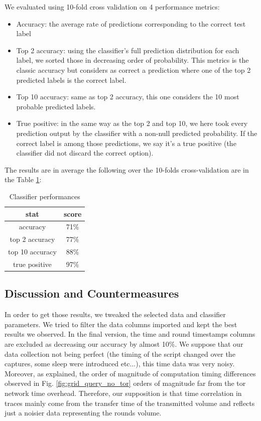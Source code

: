 \documentclass[10pt,conference,compsocconf]{IEEEtran}
\begin{document}
We evaluated using 10-fold cross validation on 4 performance metrics:
\begin{itemize}
    \item Accuracy: the average rate of predictions corresponding to the correct test label
    \item Top 2 accuracy: using the classifier's full prediction distribution for each label, we sorted those in decreasing order of probability. This metrics is the classic accuracy but considers as correct a prediction where one of the top 2 predicted labels is the correct label.
    \item Top 10 accuracy: same as top 2 accuracy, this one considers the 10 most probable predicted labels.
    \item True positive: in the same way as the top 2 and top 10, we here took every prediction output by the classifier with a non-null predicted probability. If the correct label is among those predictions, we say it's a true positive (the classifier did not discard the correct option).
\end{itemize}
The results are in average the following over the 10-folds cross-validation are in the Table \ref{tab:class_perf}:
\begin{table}[h!]
\centering
\begin{tabular}{ |c|c| } 
\hline
stat & score \\
\hline
\hline
accuracy & 71\% \\ 
top 2 accuracy & 77\% \\ 
top 10 accuracy & 88\% \\
true positive & 97\% \\ 
\hline
\end{tabular}
\caption{\label{tab:class_perf}Classifier performances}
\end{table}

\subsection{Discussion and Countermeasures}

In order to get those results, we tweaked the selected data and classifier parameters. We tried to filter the data columns imported and kept the best results we observed. In the final version, the time and round timestamps columns are excluded as decreasing our accuracy by almost 10\%. We suppose that our data collection not being perfect (the timing of the script changed over the captures, some sleep were introduced etc...), this time data was very noisy. Moreover, as explained, the order of magnitude of computation timing differences observed in Fig. \ref{fig:grid_query_no_tor} orders of magnitude far from the tor network time overhead. Therefore, our supposition is that time correlation in traces mainly come from the transfer time of the transmitted volume and reflects just a noisier data representing the rounds volume.
\end{document}
